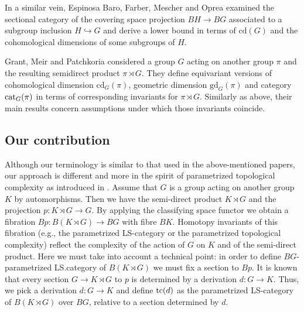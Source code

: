 \documentclass[11pt]{amsart}
\theoremstyle{plain}
\theoremstyle{definition}
\newcommand{\cat}{\mathop{\rm cat}\nolimits}
\newcommand{\tc}{\mathop{\rm tc}\nolimits}
\newcommand{\cd}{\mathrm{cd}}
\begin{document}
In a similar vein, Espinosa Baro, Farber, Mescher and Oprea \cite{EBFMO} 
examined the sectional category of the covering space projection $BH\to BG$ associated to 
a subgroup inclusion $H\hookrightarrow G$ and derive a lower bound in terms of $\cd(G)$ and
the cohomological dimensions of some subgroups of $H$.

Grant, Meir and Patchkoria \cite{GrantMeirPatchkoria2022} considered a group $G$ acting on 
another group $\pi$ and the resulting semidirect product $\pi\rtimes G$. They define 
equivariant versions of cohomological dimension $\cd_G(\pi)$, geometric dimension
$\mathrm{gd}_G(\pi)$ and category $\cat_G(\pi)$ in terms of corresponding 
invariants for $\pi\rtimes G$. Similarly as above, their main results concern 
assumptions under which those invariants coincide. 



\subsection{Our contribution}

Although our terminology is similar to that used in the above-mentioned papers, 
our approach is different and more in the 
spirit of parametrized topological complexity as introduced in \cite{CohenFarberWeinberger2021}. 
Assume that $G$ is a group acting on another group $K$ by 
automorphisms. Then we have the semi-direct product $K\rtimes G$ and the projection
$p\colon K\rtimes G\to G$. By applying the classifying space functor we obtain a fibration
$Bp\colon B(K\rtimes G)\to BG$ with fibre $BK$. Homotopy invariants of this fibration 
(e.g., the parametrized LS-category or the parametrized topological complexity) reflect 
the complexity of the action of $G$ on $K$ and of the semi-direct product. 
Here we must take into account a technical point: in order to define $BG$-parametrized 
LS.category of $B(K\rtimes G)$ we must fix a section to $Bp$. It is known that every section 
$G\to K\rtimes G$ to $p$ is determined by a derivation $d\colon G\to K$. Thus, we pick a derivation
$d\colon G\to K$ and define $\tc(d)$ as the parametrized LS-category of $B(K\rtimes G)$ over 
$BG$, relative to a section determined by $d$. 
\end{document}
